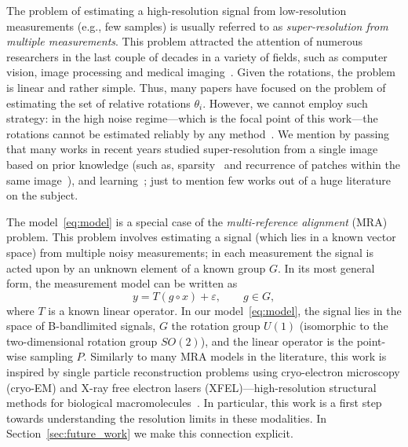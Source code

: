 \documentclass[english,12pt]{article}
\numberwithin{equation}{section}
\numberwithin{thm}{section} %
\begin{document}
The problem of estimating a high-resolution signal from low-resolution measurements (e.g., few samples) is usually referred to as \emph{super-resolution from multiple measurements}. This problem attracted the attention of numerous researchers  in the last couple of decades in a variety of fields, such as computer vision, image processing and medical imaging~\cite{park2003super,farsiu2004advances, greenspan2008super}.
Given the rotations, the problem is linear and rather simple.
Thus, many papers have focused on the problem of estimating the set of relative rotations $\theta_i$. However, we cannot employ such strategy: in the high noise regime---which is the focal point of this work---the rotations cannot be estimated reliably by any method~\cite{bendory2018toward,aguerrebere2016fundamental}. 
We mention by passing that many works in recent years studied super-resolution from a single image based on prior knowledge (such as,  sparsity~\cite{huang2009super,candes2014towards} and recurrence of patches within the same image~\cite{glasner2009super}),
and learning~\cite{lim2017enhanced}; just to mention few works out of a huge literature on the subject. 

The model~\eqref{eq:model} is a special case of the \emph{multi-reference alignment} (MRA) problem. This problem involves estimating a signal (which lies in a known vector space) from multiple noisy measurements; in each measurement the signal is acted upon by an unknown element of a known group $G$. 
In its most general form, the measurement model can be written as 
\begin{equation} \label{eq:mra}
y = T(g\circ x) +\varepsilon, \qquad g\in G,
\end{equation}
where $T$ is a known linear operator. 
In our model~\eqref{eq:model}, the signal lies in the space of B-bandlimited signals, $G$ the rotation group $U(1)$ (isomorphic to the  two-dimensional rotation group $SO(2)$), and the linear operator is the point-wise sampling $P$.
Similarly to many MRA models in the literature,  this work is  inspired by single particle reconstruction problems using cryo-electron microscopy (cryo-EM) and X-ray free electron lasers (XFEL)---high-resolution structural methods for biological macromolecules~\cite{frank2006three,kuhlbrandt2014resolution,singer2018mathematics}. 
In particular, this work is a first step towards understanding the resolution limits in these modalities. In Section~\ref{sec:future_work} we make this connection explicit.
\end{document}
